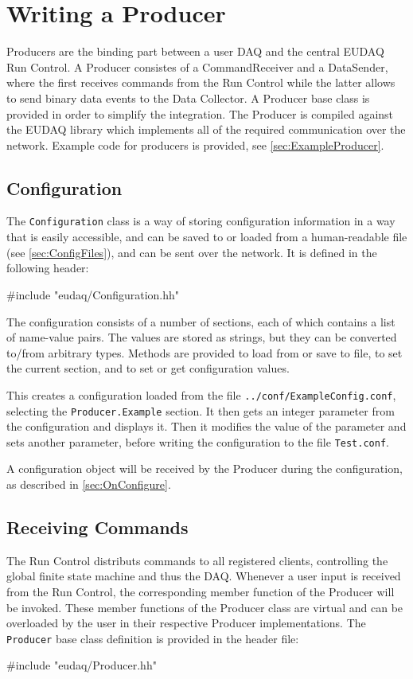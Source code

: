 \section{Writing a Producer}\label{sec:Producers}
Producers are the binding part between a user DAQ and the central EUDAQ Run Control.
A Producer consistes of a CommandReceiver and a DataSender, where the first receives commands from the Run Control while the latter allows to send binary data events to the Data Collector.
A Producer base class is provided in order to simplify the integration.
The Producer is compiled against the EUDAQ library which implements all of the required communication over the network.
Example code for producers is provided, see \autoref{sec:ExampleProducer}.

\subsection{Configuration}
The \texttt{Configuration} class is a way of storing configuration information
in a way that is easily accessible, and can be saved to or loaded from a human-readable file
(see \autoref{sec:ConfigFiles}), and can be sent over the network.
It is defined in the following header:

\begin{listing}
#include "eudaq/Configuration.hh"
\end{listing}

The configuration consists of a number of sections,
each of which contains a list of name-value pairs.
The values are stored as strings, but they can be converted to/from arbitrary types.
Methods are provided to load from or save to file, to set the current section,
and to set or get configuration values.

This creates a configuration loaded from the file \texttt{../conf/ExampleConfig.conf},
selecting the \texttt{Producer.Example} section.
It then gets an integer parameter from the configuration and displays it.
Then it modifies the value of the parameter and sets another parameter,
before writing the configuration to the file \texttt{Test.conf}.

A configuration object will be received by the Producer during the configuration,
as described in \autoref{sec:OnConfigure}.

\subsection{Receiving Commands}
The Run Control distributs commands to all registered clients, controlling the global finite state machine and thus the DAQ.
Whenever a user input is received from the Run Control, the corresponding member function of the Producer will be invoked.
These member functions of the Producer class are virtual and can be overloaded by the user in their respective Producer implementations.
The \texttt{Producer} base class definition is provided in the header file:
\begin{listing}
#include "eudaq/Producer.hh"
\end{listing}


